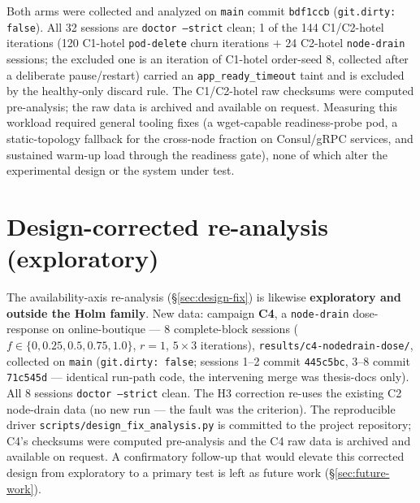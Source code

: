 Both arms were collected and analyzed on \texttt{main} commit \texttt{bdf1ccb}
(\texttt{git.dirty: false}). All 32 sessions are \texttt{doctor --strict} clean;
1 of the 144 C1/C2-hotel iterations (120 C1-hotel \texttt{pod-delete} churn
iterations $+$ 24 C2-hotel \texttt{node-drain} sessions; the excluded one is an
iteration of C1-hotel order-seed 8, collected after a deliberate pause/restart)
carried an \texttt{app\_ready\_timeout} taint and is excluded by the
healthy-only discard rule. The C1/C2-hotel raw checksums were computed pre-analysis; the raw data is
archived and available on request. Measuring this workload
required general tooling fixes (a wget-capable readiness-probe pod, a
static-topology fallback for the cross-node fraction on Consul/gRPC services, and
sustained warm-up load through the readiness gate), none of which alter the
experimental design or the system under test.

\section{Design-corrected re-analysis (exploratory)}\label{sec:designfix-provenance}

The availability-axis re-analysis (\S\ref{sec:design-fix}) is likewise
\textbf{exploratory and outside the Holm family}.
New data: campaign \textbf{C4}, a \texttt{node-drain} dose-response on
online-boutique --- 8 complete-block sessions ($f \in \{0,0.25,0.5,0.75,1.0\}$,
$r{=}1$, $5\times3$ iterations), \texttt{results/c4-nodedrain-dose/}, collected on
\texttt{main} (\texttt{git.dirty: false}; sessions 1--2 commit \texttt{445c5bc},
3--8 commit \texttt{71c545d} --- identical run-path code, the intervening merge was
thesis-docs only). All 8 sessions \texttt{doctor --strict} clean. The H3
correction re-uses the existing C2 node-drain data (no new run --- the fault was
the criterion). The reproducible driver \texttt{scripts/design\_fix\_analysis.py} is committed
to the project repository; C4's checksums were computed pre-analysis and the C4
raw data is archived and available on request. A
confirmatory follow-up that would elevate this corrected design from exploratory
to a primary test is left as future work (\S\ref{sec:future-work}).
